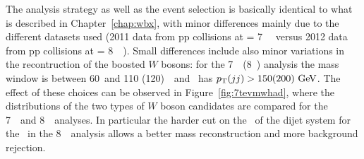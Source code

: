 The analysis strategy as well as the event selection is
basically identical to what is described in Chapter~\ref{chap:wbx},
with minor differences mainly due to the different datasets
used (2011 data from pp collisions at \rts = 7~\tev~\cite{topCommonObjects2012}
versus 2012 data from pp collisions at \rts = 8~\tev~\cite{topCommonObjects2013}).
Small differences include also minor variations in the recontruction
of the boosted $W$ bosons: for the 7~\tev\ (8~\tev) analysis
the mass window is between 60~\gev and 110 (120)~\gev\ and \wii\ 
has $\pt(jj)>150 (200)\gev$. The effect of these choices can
be observed in Figure~\ref{fig:7tevmwhad}, where the distributions
of the two types of $W$ boson candidates are compared for the 7~\tev\ and 8~\tev\ analyses.
In particular the harder cut on the \pt\ of the dijet system for the  \wii\ 
in the 8~\tev\ analysis allows a better mass reconstruction and more background
rejection.

